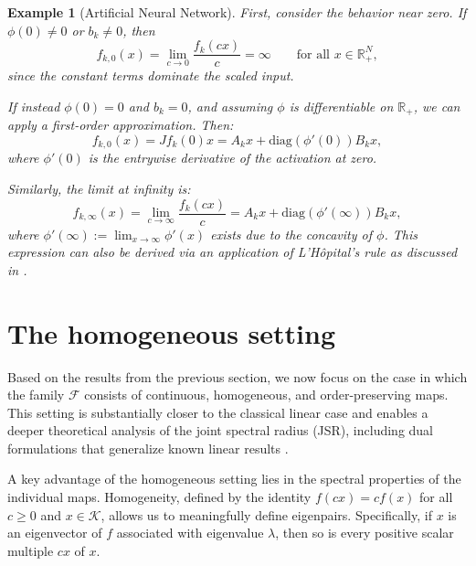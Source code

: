 \documentclass{article}
\newtheorem{example}[theorem]{Example}
\newcommand{\R}{\mathbb{R}}
\newcommand{\family}{\mathcal{F}}
\newcommand{\cone}{\mathcal{K}}
\begin{document}
\begin{example}[Artificial Neural Network]
First, consider the behavior near zero. If $\phi(0) \neq 0$ or $b_k \neq 0$, then
\[
f_{k,0}(x) = \lim_{c \to 0} \frac{f_k(cx)}{c} = \infty \qquad \text{for all } x \in \R_+^N,
\]
since the constant terms dominate the scaled input.

If instead $\phi(0) = 0$ and $b_k = 0$, and assuming $\phi$ is differentiable on $\R_+$, we can apply a first-order approximation. Then:
\begin{equation}
    f_{k,0}(x) = Jf_k(0)x = A_k x + \mathrm{diag}(\phi'(0)) B_k x,
\end{equation}
where $\phi'(0)$ is the entrywise derivative of the activation at zero.

Similarly, the limit at infinity is:
\begin{equation}
    f_{k,\infty}(x) = \lim_{c \to \infty} \frac{f_k(c x)}{c} = A_k x + \mathrm{diag}(\phi'(\infty)) B_k x,
\end{equation}
where $\phi'(\infty) := \lim_{x \to \infty} \phi'(x)$ exists due to the concavity of $\phi$. This expression can also be derived via an application of L'Hôpital's rule as discussed in \cite{piotrowski2024fixed}.



\end{example}










\section{The homogeneous setting}
\label{Sec:jsr_homogeneous_case}

Based on the results from the previous section, we now focus on the case in which the family $\family$ consists of continuous, homogeneous, and order-preserving maps. This setting is substantially closer to the classical linear case and enables a deeper theoretical analysis of the joint spectral radius (JSR), including dual formulations that generalize known linear results \cite{jungers2009joint}.

A key advantage of the homogeneous setting lies in the spectral properties of the individual maps. Homogeneity, defined by the identity $f(cx) = c f(x)$ for all $c \geq 0$ and $x \in \cone$, allows us to meaningfully define eigenpairs. Specifically, if $x$ is an eigenvector of $f$ associated with eigenvalue $\lambda$, then so is every positive scalar multiple $cx$ of $x$. 
\end{document}
